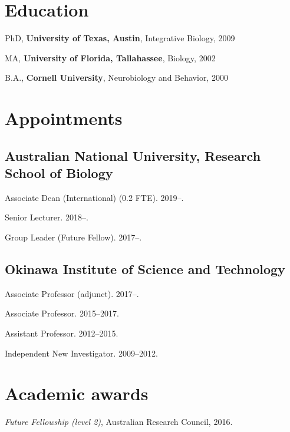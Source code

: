\documentclass[11pt]{article}
\title{}
\def\printdate#1{\xprintdate#1-}
\def\xprintdate#1-#2-#3-{#1}
\def\daterange#1#2{\xprintdate#1---\xprintdate#2-}
\begin{document}
\maketitle

\section{Education}

\ind PhD, \textbf{University of Texas, Austin}, Integrative Biology, \printdate{2009-05-01}


\ind MA, \textbf{University of Florida, Tallahassee}, Biology, \printdate{2002-05-01}


\ind B.A., \textbf{Cornell University}, Neurobiology and Behavior, \printdate{2000-05-01}



\section{Appointments}

\subsection{Australian National University, Research School of Biology}
\ind Associate Dean (International) (0.2 FTE). \printdate{2019-00-00}--.

\ind Senior Lecturer. \printdate{2018-06-01}--.

\ind Group Leader (Future Fellow). \printdate{2017-07-30}--.

\subsection{Okinawa Institute of Science and Technology}
\ind Associate Professor (adjunct). \printdate{2017-00-00}--.

\ind Associate Professor. \daterange{2015-00-00}{2017-00-00}.

\ind Assistant Professor. \daterange{2012-00-00}{2015-00-00}.

\ind Independent New Investigator. \daterange{2009-08-00}{2012-00-00}.


\section{Academic awards}

\ind \textit{Future Fellowship (level 2)}, Australian Research Council, 2016.
\end{document}
